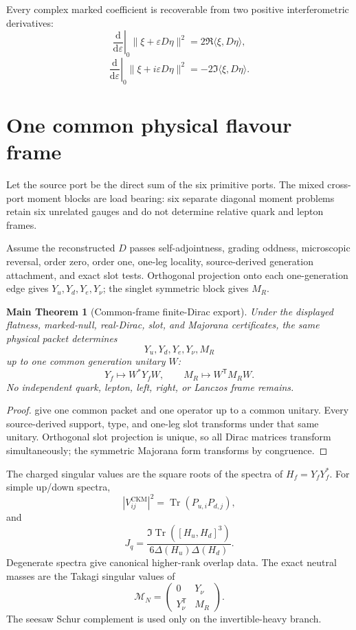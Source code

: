 \documentclass[11pt,oneside,openany]{book}
\numberwithin{equation}{chapter}
\newtheorem{maintheorem}[theorem]{Main Theorem}
\theoremstyle{definition}
\theoremstyle{remark}
\newcommand{\Tr}{\operatorname{Tr}}
\newcommand{\norm}[1]{\lVert #1\rVert}
\newcommand{\dd}{\mathrm d}
\newcommand{\CKM}{\mathrm{CKM}}
\begin{document}
Every complex marked coefficient is recoverable from two positive
interferometric derivatives:
\[
 \left.\frac{\dd}{\dd\varepsilon}\right|_0\norm{\xi+\varepsilon D\eta}^2
 =2\Re\langle\xi,D\eta\rangle,
\]
\[
 \left.\frac{\dd}{\dd\varepsilon}\right|_0\norm{\xi+i\varepsilon D\eta}^2
 =-2\Im\langle\xi,D\eta\rangle.
\]

\section{One common physical flavour frame}
Let the source port be the direct sum of the six primitive ports.  The mixed
cross-port moment blocks are load bearing: six separate diagonal moment
problems retain six unrelated gauges and do not determine relative quark and
lepton frames.

Assume the reconstructed \(D\) passes self-adjointness, grading oddness,
microscopic reversal, order zero, order one, one-leg locality, source-derived
generation attachment, and exact slot tests.  Orthogonal projection onto each
one-generation edge gives \(Y_u,Y_d,Y_e,Y_\nu\); the singlet symmetric block gives
\(M_R\).

\begin{maintheorem}[Common-frame finite-Dirac export]
\label{thm:v6-dirac-export}
Under the displayed flatness, marked-null, real-Dirac, slot, and Majorana
certificates, the same physical packet determines
\[
 \boxed{Y_u,Y_d,Y_e,Y_\nu,M_R}
\]
up to one common generation unitary \(W\):
\[
 Y_f\mapsto W^*Y_fW,\qquad
 M_R\mapsto W^{\mathsf T}M_RW.
\]
No independent quark, lepton, left, right, or Lanczos frame remains.
\end{maintheorem}

\begin{proof}
 give one common packet and one
operator up to a common unitary.  Every source-derived support, type, and
one-leg slot transforms under that same unitary.  Orthogonal slot projection is
unique, so all Dirac matrices transform simultaneously; the symmetric
Majorana form transforms by congruence.
\end{proof}

The charged singular values are the square roots of the spectra of
\(H_f=Y_fY_f^*\).  For simple up/down spectra,
\[
 \boxed{|V_{ij}^{\CKM}|^2=\Tr(P_{u,i}P_{d,j})},
\]
and
\[
 \boxed{J_q=\frac{\Im\Tr([H_u,H_d]^3)}{6\Delta(H_u)\Delta(H_d)}}.
\]
Degenerate spectra give canonical higher-rank overlap data.  The exact neutral
masses are the Takagi singular values of
\[
 \mathcal M_N=\begin{pmatrix}0&Y_\nu\\Y_\nu^{\mathsf T}&M_R\end{pmatrix}.
\]
The seesaw Schur complement is used only on the invertible-heavy branch.
\end{document}
